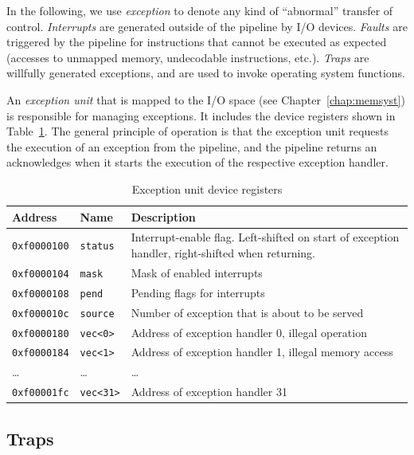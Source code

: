 \documentclass[a4paper,fontsize=10pt,twoside,DIV15,BCOR12mm,headinclude=true,footinclude=false,pagesize,bibtotoc]{scrbook}
\begin{document}
In the following, we use \emph{exception} to denote any kind of
``abnormal'' transfer of control. \emph{Interrupts} are generated
outside of the pipeline by I/O devices. \emph{Faults} are triggered by
the pipeline for instructions that cannot be executed as expected
(accesses to unmapped memory, undecodable instructions,
etc.). \emph{Traps} are willfully generated exceptions, and are used
to invoke operating system functions.

An \emph{exception unit} that is mapped to the I/O space (see
Chapter~\ref{chap:memsyst}) is responsible for managing exceptions. It
includes the device registers shown in Table~\ref{tab:excioregs}. The
general principle of operation is that the exception unit requests the
execution of an exception from the pipeline, and the pipeline returns
an acknowledges when it starts the execution of the respective
exception handler.

\begin{table}[b]
  \centering
  \begin{tabular}{llp{}}
    \toprule
    Address             & Name             & Description \\
    \midrule
    \texttt{0xf0000100} & \texttt{status} & Interrupt-enable
    flag. Left-shifted on start of exception handler, right-shifted
    when returning. \\
    \texttt{0xf0000104} & \texttt{mask} & Mask of enabled interrupts \\
    \texttt{0xf0000108} & \texttt{pend} & Pending flags for interrupts \\
    \texttt{0xf000010c} & \texttt{source} & Number of exception that
    is about to be served \\
    \cmidrule{1-3}
    \texttt{0xf0000180} & \texttt{vec<0>} & Address of exception handler 0, illegal operation \\
    \texttt{0xf0000184} & \texttt{vec<1>} & Address of exception handler 1, illegal memory access \\
    \ldots & \ldots & \ldots \\
    \texttt{0xf00001fc} & \texttt{vec<31>} & Address of exception handler 31 \\
    \bottomrule
  \end{tabular}
  \caption{Exception unit device registers}
  \label{tab:excioregs}
\end{table}

\subsection{Traps}
\end{document}
